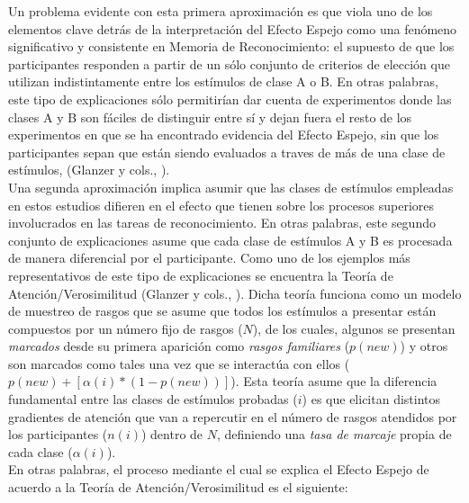 Un problema evidente con esta primera aproximación es que viola uno de los elementos clave detrás de la interpretación del Efecto Espejo como una fenómeno significativo y consistente en Memoria de Reconocimiento: el supuesto de que los participantes responden a partir de un sólo conjunto de criterios de elección que utilizan indistintamente entre los estímulos de clase A o B. En otras palabras, este tipo de explicaciones sólo permitirían dar cuenta de experimentos donde las clases A y B son fáciles de distinguir entre sí y dejan fuera el resto de los experimentos en que se ha encontrado evidencia del Efecto Espejo, sin que los participantes sepan que están siendo evaluados a traves de más de una clase de estímulos, (Glanzer y cols., \citeyear{Glanzer1998}).\\

Una segunda aproximación implica asumir que las clases de estímulos empleadas en estos estudios difieren en el efecto que tienen sobre los procesos superiores involucrados en las tareas de reconocimiento. En otras palabras, este segundo conjunto de explicaciones asume que cada clase de estímulos A y B es procesada de manera diferencial por el participante. Como uno de los ejemplos más representativos de este tipo de explicaciones se encuentra la Teoría de Atención/Verosimilitud (Glanzer y cols., \citeyear{Glanzer1993}). Dicha teoría funciona como un modelo de muestreo de rasgos que se asume que todos los estímulos a presentar están compuestos por un número fijo de rasgos ($N$), de los cuales, algunos se presentan \textit{marcados} desde su primera aparición como \textit{rasgos familiares} ($p(new)$) y otros son marcados como tales una vez que se interactúa con ellos ($p(new) + [\alpha(i)* (1-p(new))]$). Esta teoría asume que la diferencia fundamental entre  las clases de estímulos probadas ($i$) es que elicitan distintos gradientes de atención que van a repercutir en el número de rasgos atendidos por los participantes ($n(i)$) dentro de $N$, definiendo una \textit{tasa de marcaje} propia de cada clase ($\alpha(i)$).\\

En otras palabras, el proceso mediante el cual se explica el Efecto Espejo de acuerdo a la Teoría de Atención/Verosimilitud es el siguiente:\\

